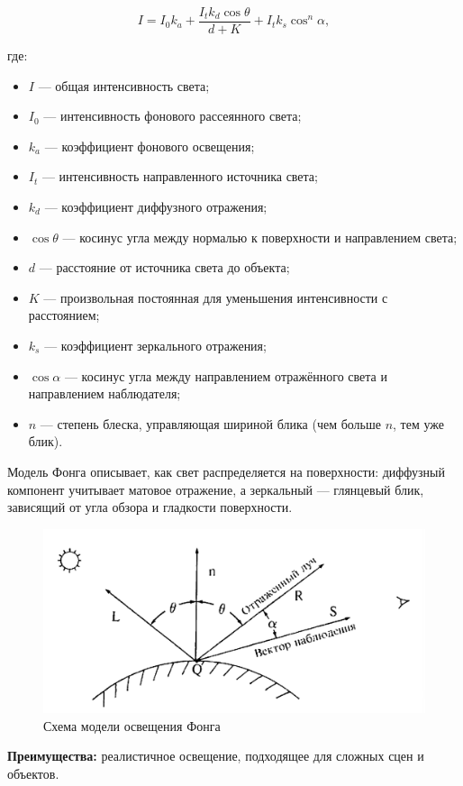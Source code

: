 $$
I = I_0 k_a + \frac{I_t k_d \cos \theta}{d + K} + I_t k_s \cos^n \alpha,
$$

где:
\begin{itemize}[label=---]
    \item $I$ — общая интенсивность света;
    \item $I_0$ — интенсивность фонового рассеянного света;
    \item $k_a$ — коэффициент фонового освещения;
    \item $I_t$ — интенсивность направленного источника света;
    \item $k_d$ — коэффициент диффузного отражения;
    \item $\cos \theta$ — косинус угла между нормалью к поверхности и направлением света;
    \item $d$ — расстояние от источника света до объекта;
    \item $K$ — произвольная постоянная для уменьшения интенсивности с расстоянием;
    \item $k_s$ — коэффициент зеркального отражения;
    \item $\cos \alpha$ — косинус угла между направлением отражённого света и направлением наблюдателя;
    \item $n$ — степень блеска, управляющая шириной блика (чем больше $n$, тем уже блик).
\end{itemize}

Модель Фонга описывает, как свет распределяется на поверхности: диффузный компонент учитывает матовое отражение, а зеркальный — глянцевый блик, зависящий от угла обзора и гладкости поверхности.

\begin{figure}[H]
    \centering
    \includegraphics[width=0.8\linewidth]{images/light/phong.png}
    \caption{Схема модели освещения Фонга}
    \label{fig:lambert}
\end{figure}


\textbf{Преимущества:} реалистичное освещение, подходящее для сложных сцен и объектов.

